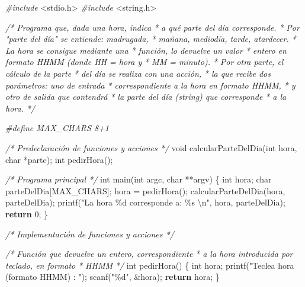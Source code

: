 \documentclass[
]{book}
\newenvironment{Shaded}{\begin{snugshade}}{\end{snugshade}}
\newcommand{\CommentTok}[1]{\textcolor[rgb]{0.56,0.35,0.01}{\textit{#1}}}
\newcommand{\ControlFlowTok}[1]{\textcolor[rgb]{0.13,0.29,0.53}{\textbf{#1}}}
\newcommand{\DataTypeTok}[1]{\textcolor[rgb]{0.13,0.29,0.53}{#1}}
\newcommand{\DecValTok}[1]{\textcolor[rgb]{0.00,0.00,0.81}{#1}}
\newcommand{\ImportTok}[1]{#1}
\newcommand{\NormalTok}[1]{#1}
\newcommand{\PreprocessorTok}[1]{\textcolor[rgb]{0.56,0.35,0.01}{\textit{#1}}}
\newcommand{\SpecialCharTok}[1]{\textcolor[rgb]{0.00,0.00,0.00}{#1}}
\newcommand{\StringTok}[1]{\textcolor[rgb]{0.31,0.60,0.02}{#1}}
\begin{document}
\begin{Shaded}
\begin{Highlighting}[]
\PreprocessorTok{\#include }\ImportTok{\textless{}stdio.h\textgreater{}}
\PreprocessorTok{\#include }\ImportTok{\textless{}string.h\textgreater{}}

\CommentTok{/* Programa que, dada una hora, indica}
\CommentTok{ * a qué parte del día corresponde.}
\CommentTok{ * Por "parte del día" se entiende: madrugada,}
\CommentTok{ * mañana, mediodía, tarde, atardecer.}
\CommentTok{ * La hora se consigue mediante una}
\CommentTok{ * función, lo devuelve un valor}
\CommentTok{ * entero en formato HHMM (donde HH = hora y}
\CommentTok{ * MM = minuto).}
\CommentTok{ * Por otra parte, el cálculo de la parte}
\CommentTok{ * del día se realiza con una acción,}
\CommentTok{ * la que recibe dos parámetros: uno de entrada}
\CommentTok{ * correspondiente a la hora en formato HHMM,}
\CommentTok{ * y otro de salida que contendrá}
\CommentTok{ * la parte del día (string) que corresponde}
\CommentTok{ * a la hora.}
\CommentTok{ */}

\PreprocessorTok{\#define MAX\_CHARS 8+1}

\CommentTok{/* Predeclaración de funciones y acciones */}
\DataTypeTok{void}\NormalTok{ calcularParteDelDia(}\DataTypeTok{int}\NormalTok{ hora, }\DataTypeTok{char}\NormalTok{ *parte);}
\DataTypeTok{int}\NormalTok{ pedirHora();}

\CommentTok{/* Programa principal */}
\DataTypeTok{int}\NormalTok{ main(}\DataTypeTok{int}\NormalTok{ argc, }\DataTypeTok{char}\NormalTok{ **argv) \{}
    \DataTypeTok{int}\NormalTok{ hora;}
    \DataTypeTok{char}\NormalTok{ parteDelDia[MAX\_CHARS];}
\NormalTok{    hora = pedirHora();}
\NormalTok{    calcularParteDelDia(hora, parteDelDia);}
\NormalTok{    printf(}\StringTok{"La hora \%d corresponde a: \%s }\SpecialCharTok{\textbackslash{}n}\StringTok{"}\NormalTok{, hora, parteDelDia);}
    \ControlFlowTok{return} \DecValTok{0}\NormalTok{;}
\NormalTok{\}}

\CommentTok{/* Implementación de funciones y acciones */}

\CommentTok{/* Función que devuelve un entero, correspondiente}
\CommentTok{ * a la hora introducida por teclado, en formato}
\CommentTok{ * HHMM}
\CommentTok{ */}
\DataTypeTok{int}\NormalTok{ pedirHora() \{}
    \DataTypeTok{int}\NormalTok{ hora;}
\NormalTok{    printf(}\StringTok{"Teclea hora (formato HHMM) : "}\NormalTok{);}
\NormalTok{    scanf(}\StringTok{"\%d"}\NormalTok{, \&hora);}
    \ControlFlowTok{return}\NormalTok{ hora;}
\NormalTok{\}}


\end{Highlighting}
\end{Shaded}
\end{document}
